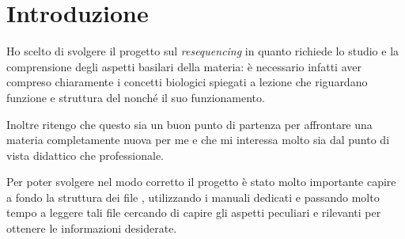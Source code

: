 \section{Introduzione}
Ho scelto di svolgere il progetto sul \emph{resequencing} in quanto richiede lo studio e la comprensione degli aspetti basilari della materia: è necessario infatti aver compreso chiaramente i concetti biologici spiegati a lezione che riguardano funzione e struttura del  nonché il suo funzionamento.

Inoltre ritengo che questo sia un buon punto di partenza per affrontare una materia completamente nuova per me e che mi interessa molto sia dal punto di vista didattico che professionale.

Per poter svolgere nel modo corretto il progetto è stato molto importante capire a fondo la struttura dei file , utilizzando i manuali dedicati e passando molto tempo a leggere tali file cercando di capire gli aspetti peculiari e rilevanti per ottenere le informazioni desiderate.